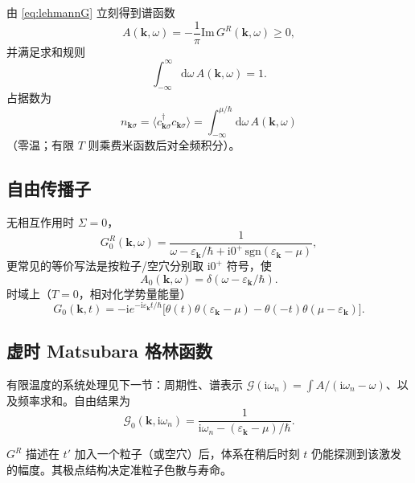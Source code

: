 由 \eqref{eq:lehmannG} 立刻得到谱函数
\begin{equation}
  A(\mathbf{k},\omega)
  =-\frac{1}{\pi}\mathrm{Im}\,G^R(\mathbf{k},\omega)
  \ge0,
\end{equation}
并满足求和规则
\begin{equation}
  \int_{-\infty}^{\infty}\mathrm{d}\omega\,A(\mathbf{k},\omega)=1.
\end{equation}
占据数为
\begin{equation}
  n_{\mathbf{k}\sigma}
  =\langle c_{\mathbf{k}\sigma}^\dagger c_{\mathbf{k}\sigma}\rangle
  =\int_{-\infty}^{\mu/\hbar}
  \mathrm{d}\omega\,A(\mathbf{k},\omega)
\end{equation}
（零温；有限 $T$ 则乘费米函数后对全频积分）。

\subsection{自由传播子}

无相互作用时 $\Sigma=0$，
\begin{equation}
  G_0^R(\mathbf{k},\omega)
  =\frac{1}{\omega-\varepsilon_{\mathbf{k}}/\hbar+\mathrm{i}0^+\,\mathrm{sgn}(\varepsilon_{\mathbf{k}}-\mu)},
\end{equation}
更常见的等价写法是按粒子/空穴分别取 $\mathrm{i}0^+$ 符号，使
\begin{equation}
  A_0(\mathbf{k},\omega)=\delta(\omega-\varepsilon_{\mathbf{k}}/\hbar).
\end{equation}
时域上（$T=0$，相对化学势量能量）
\begin{equation}
  G_0(\mathbf{k},t)
  =-\mathrm{i}e^{-\mathrm{i}\varepsilon_{\mathbf{k}}t/\hbar}
  \bigl[
  \theta(t)\theta(\varepsilon_{\mathbf{k}}-\mu)
  -\theta(-t)\theta(\mu-\varepsilon_{\mathbf{k}})
  \bigr].
\end{equation}

\subsection{虚时 Matsubara 格林函数}

有限温度的系统处理见下一节：周期性、谱表示 $\mathcal{G}(\mathrm{i}\omega_n)=\int A/(\mathrm{i}\omega_n-\omega)$、以及频率求和。自由结果为
\begin{equation}
  \mathcal{G}_0(\mathbf{k},\mathrm{i}\omega_n)
  =\frac{1}{\mathrm{i}\omega_n-(\varepsilon_{\mathbf{k}}-\mu)/\hbar}.
\end{equation}

\begin{definition}[单粒子传播的直观含义]
$G^R$ 描述在 $t'$ 加入一个粒子（或空穴）后，体系在稍后时刻 $t$ 仍能探测到该激发的幅度。其极点结构决定准粒子色散与寿命。
\end{definition}
